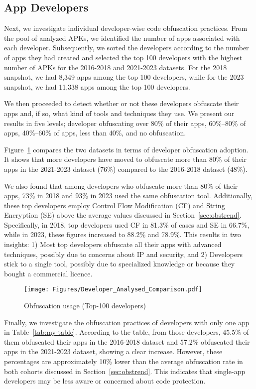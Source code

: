 \subsection{App Developers}
Next, we investigate individual developer-wise code obfuscation practices. From the pool of analyzed APKs, we identified the number of apps associated with each developer. Subsequently, we sorted the developers according to the number of apps they had created and selected the top 100 developers with the highest number of APKs for the 2016-2018 and 2021-2023 datasets. For the 2018 snapshot, we had 8,349 apps among the top 100 developers, while for the 2023 snapshot, we had 11,338 apps among the top 100 developers.

We then proceeded to detect whether or not these developers obfuscate their apps and, if so, what kind of tools and techniques they use. We present our results in five levels; developer obfuscating over 80\% of their apps, 60\%--80\% of apps, 40\%--60\% of apps, less than 40\%, and no obfuscation.

Figure~\ref{fig:developer_trend_my_apps_all} compares the two datasets in terms of developer obfuscation adoption. It shows that more developers have moved to obfuscate more than 80\% of their apps in the 2021-2023 dataset (76\%) compared to the 2016-2018 dataset (48\%).

We also found that among developers who obfuscate more than 80\% of their apps, 73\% in 2018 and 93\% in 2023 used the same obfuscation tool. Additionally, these top developers employ Control Flow Modification (CF) and String Encryption (SE) above the average values discussed in Section~\ref{sec:obstrend}. Specifically, in 2018, top developers used CF in 81.3\% of cases and SE in 66.7\%, while in 2023, these figures increased to 88.2\% and 78.9\%. This results in two insights: 1) Most top developers obfuscate all their apps with advanced techniques, possibly due to concerns about IP and security, and 2) Developers stick to a single tool, possibly due to specialized knowledge or because they bought a commercial licence.

\begin{figure}[]
    \centering
    \texttt{[image: Figures/Developer\_Analysed\_Comparison.pdf]}
    \caption{Obfuscation usage (Top-100 developers)}
    \label{fig:developer_trend_my_apps_all}
\end{figure}


Finally, we investigate the obfuscation practices of developers with only one app in Table~\ref{tab:my-table}. According to the table, from those developers, 45.5\% of them obfuscated their apps in the 2016-2018 dataset and 57.2\% obfuscated their apps in the 2021-2023 dataset, showing a clear increase. However, these percentages are approximately 10\% lower than the average obfuscation rate in both cohorts discussed in Section~\ref{sec:obstrend}. This indicates that single-app developers may be less aware or concerned about code protection.


